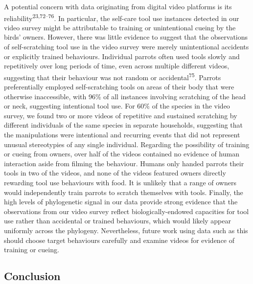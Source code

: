 \documentclass[
  man, donotrepeattitle,floatsintext]{apa6}
\begin{document}
A potential concern with data originating from digital video platforms is its
reliability\textsuperscript{23,72--76}.
In particular, the self-care tool use instances detected in our video survey
might be attributable to training or unintentional cueing by the birds' owners.
However, there was little evidence to suggest that the observations of
self-scratching tool use in the video survey were merely unintentional accidents
or explicitly trained behaviours. Individual parrots often used tools slowly and
repetitively over long periods of time, even across multiple different videos,
suggesting that their behaviour was not random or accidental\textsuperscript{75}.
Parrots preferentially employed self-scratching tools on areas of their body
that were otherwise inaccessible, with 96\% of all instances involving scratching
of the head or neck, suggesting intentional tool use. For 60\% of the species in
the video survey, we found two or more videos of repetitive and sustained
scratching by different individuals of the same species in separate households,
suggesting that the manipulations were intentional and recurring events that did
not represent unusual stereotypies of any single individual. Regarding the
possibility of training or cueing from owners, over half of the videos contained
no evidence of human interaction aside from filming the behaviour. Humans only
handed parrots their tools in two of the videos, and none of the videos featured
owners directly rewarding tool use behaviours with food. It is unlikely that
a range of owners would independently train parrots to scratch themselves with
tools. Finally, the high levels of phylogenetic signal in our data provide
strong evidence that the observations from our video survey reflect
biologically-endowed capacities for tool use rather than accidental or trained
behaviours, which would likely appear uniformly across the phylogeny.
Nevertheless, future work using data such as this should choose target
behaviours carefully and examine videos for evidence of training or cueing.

\hypertarget{conclusion}{%
\subsection{Conclusion}\label{conclusion}}
\end{document}
